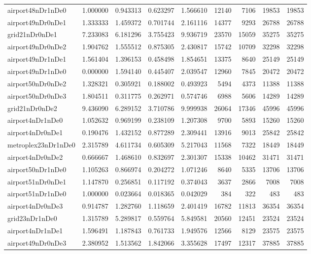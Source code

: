 \begin{longtable}{|l|r|r|r|r|r|r|r|r|}
airport48nDr1nDe0 & 1.000000 & 0.943313 & 0.623297 & 1.566610 & 12140 & 7106 & 19853 & 19853 \\
airport49nDr0nDe1 & 1.333333 & 1.459372 & 0.701744 & 2.161116 & 14377 & 9293 & 26788 & 26788 \\
grid21nDr0nDe1 & 7.233083 & 6.181296 & 3.755423 & 9.936719 & 23570 & 15059 & 35275 & 35275 \\
airport49nDr0nDe2 & 1.904762 & 1.555512 & 0.875305 & 2.430817 & 15742 & 10709 & 32298 & 32298 \\
airport49nDr1nDe1 & 1.561404 & 1.396153 & 0.458498 & 1.854651 & 13375 & 8640 & 25149 & 25149 \\
airport49nDr1nDe0 & 0.000000 & 1.594140 & 0.445407 & 2.039547 & 12960 & 7845 & 20472 & 20472 \\
airport50nDr0nDe2 & 1.328321 & 0.305921 & 0.188002 & 0.493923 & 5494 & 4373 & 11388 & 11388 \\
airport50nDr0nDe3 & 1.804511 & 0.311775 & 0.262971 & 0.574746 & 6988 & 5606 & 14289 & 14289 \\
grid21nDr0nDe2 & 9.436090 & 6.289152 & 3.710786 & 9.999938 & 26064 & 17346 & 45996 & 45996 \\
airport4nDr1nDe0 & 1.052632 & 0.969199 & 0.238109 & 1.207308 & 9700 & 5893 & 15260 & 15260 \\
airport4nDr0nDe1 & 0.190476 & 1.432152 & 0.877289 & 2.309441 & 13916 & 9013 & 25842 & 25842 \\
metroplex23nDr1nDe0 & 2.315789 & 4.611734 & 0.605309 & 5.217043 & 11568 & 7322 & 18449 & 18449 \\
airport4nDr0nDe2 & 0.666667 & 1.468610 & 0.832697 & 2.301307 & 15338 & 10462 & 31471 & 31471 \\
airport50nDr1nDe0 & 1.105263 & 0.866974 & 0.204272 & 1.071246 & 8640 & 5335 & 13706 & 13706 \\
airport51nDr0nDe1 & 1.147870 & 0.256851 & 0.117192 & 0.374043 & 3637 & 2866 & 7008 & 7008 \\
airport51nDr1nDe0 & 1.000000 & 0.023664 & 0.018365 & 0.042029 & 384 & 322 & 483 & 483 \\
airport4nDr0nDe3 & 0.914787 & 1.282760 & 1.118659 & 2.401419 & 16782 & 11813 & 36354 & 36354 \\
grid23nDr1nDe0 & 1.315789 & 5.289817 & 0.559764 & 5.849581 & 20560 & 12451 & 23524 & 23524 \\
airport4nDr1nDe1 & 1.596491 & 1.187843 & 0.761733 & 1.949576 & 12566 & 8129 & 23575 & 23575 \\
airport49nDr0nDe3 & 2.380952 & 1.513562 & 1.842066 & 3.355628 & 17497 & 12317 & 37885 & 37885 \\

\end{longtable}

